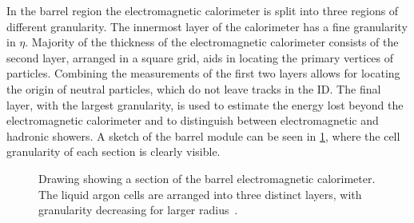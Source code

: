 In the barrel region the electromagnetic calorimeter is split into three regions of different granularity. The innermost layer of the calorimeter has a fine granularity in $\eta$. Majority of the thickness of the electromagnetic calorimeter consists of the second layer, arranged in a square grid, aids in locating the primary vertices of particles. Combining the measurements of the first two layers allows for locating the origin of neutral particles, which do not leave tracks in the ID. The final layer, with the largest granularity, is used to estimate the energy lost beyond the electromagnetic calorimeter and to distinguish between electromagnetic and hadronic showers. A sketch of the barrel module can be seen in \cref{fig:method:ATLAS:ECal}, where the cell granularity of each section is clearly visible.
\begin{figure}
    \centering
    \caption[Drawing showing a section of the barrel electromagnetic calorimeter]{Drawing showing a section of the barrel electromagnetic calorimeter.
    The liquid argon cells are arranged into three distinct layers, with granularity decreasing for larger radius~\cite{ATLAS}.}
    \label{fig:method:ATLAS:ECal}
\end{figure}

